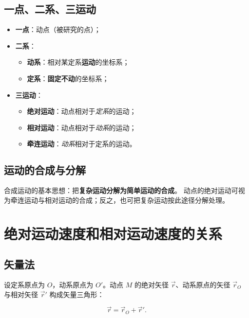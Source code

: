 \subsection{一点、二系、三运动}

\begin{definition}[一点、二系、三运动]\label{def:8-123}
\begin{itemize}
  \item \textbf{一点}：动点（被研究的点）；
  \item \textbf{二系}：
        \begin{itemize}
          \item \textbf{动系}：相对某定系\textbf{运动}的坐标系；
          \item \textbf{定系}：\textbf{固定不动}的坐标系；
        \end{itemize}
  \item \textbf{三运动}：
        \begin{itemize}
          \item \textbf{绝对运动}：动点相对于\emph{定系}的运动；
          \item \textbf{相对运动}：动点相对于\emph{动系}的运动；
          \item \textbf{牵连运动}：\emph{动系}相对于定系的运动。
        \end{itemize}
\end{itemize}
\end{definition}

\subsection{运动的合成与分解}

合成运动的基本思想：把\textbf{复杂运动分解为简单运动的合成}。
动点的绝对运动可视为牵连运动与相对运动的合成；反之，也可把复杂运动按此途径分解处理。

\section{绝对运动速度和相对运动速度的关系}

\subsection{矢量法}

设定系原点为 $O$，动系原点为 $O'$。动点 $M$ 的绝对矢径 $\vec r$、动系原点的矢径
$\vec r_O$ 与相对矢径 $\vec r'$ 构成矢量三角形：

\begin{equation}\label{eq:8-r-decomp}
  \vec r = \vec r_O + \vec r' .
\end{equation}

